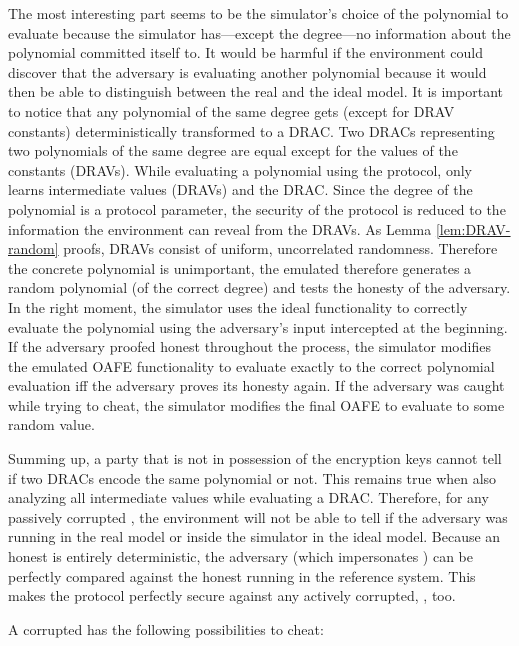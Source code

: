 The most interesting part seems to be the simulator's choice of the polynomial
to evaluate because the simulator has---except the degree---no information about
the polynomial \JWpOne{} committed itself to. It would be harmful if the
environment could discover that the adversary is evaluating another polynomial
because it would then be able to distinguish between the real and the ideal
model. It is important to notice that any polynomial of the same degree gets
(except for DRAV constants) deterministically transformed to a DRAC. Two DRACs
representing two polynomials of the same degree are equal except for the values
of the constants (DRAVs).  While evaluating a polynomial using the protocol,
\JWpTwo{} only learns intermediate values (DRAVs) and the DRAC. Since the degree
of the polynomial is a protocol parameter, the security of the protocol is
reduced to the information the environment can reveal from the DRAVs. As Lemma
\ref{lem:DRAV-random} proofs, DRAVs consist of uniform, uncorrelated randomness.
Therefore the concrete polynomial is unimportant, the emulated \JWpOne{}
therefore generates a random polynomial (of the correct degree) and tests the
honesty of the adversary. In the right moment, the simulator uses the ideal
functionality \JWfuncSymOPE{} to correctly evaluate the polynomial using the
adversary's input intercepted at the beginning. If the adversary proofed honest
throughout the process, the simulator modifies the emulated OAFE functionality
to evaluate exactly to the correct polynomial evaluation iff the adversary
proves its honesty again. If the adversary was caught while trying to cheat, the
simulator modifies the final OAFE to evaluate to some random value.

Summing up, a party that is not in possession of the encryption keys cannot tell
if two DRACs encode the same polynomial or not. This remains true when also
analyzing all intermediate values while evaluating a DRAC. Therefore, for any
passively corrupted \JWadv{}, the environment will not be able to tell if the
adversary \JWadv{} was running in the real model or inside the simulator in the
ideal model. Because an honest \JWpTwo{} is entirely deterministic, the
adversary (which impersonates \JWpTwo{}) can be perfectly compared against the
honest \JWpTwo{} running in the reference system. This makes the protocol
perfectly secure against any actively corrupted, \JWpTwo{}, too.



A corrupted \JWpOne{} has the following possibilities to cheat:

